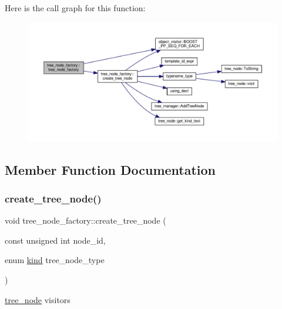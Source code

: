 Here is the call graph for this function\+:
\nopagebreak
\begin{figure}[H]
\begin{center}
\leavevmode
\includegraphics[width=350pt]{d8/da3/structtree__node__factory_ad35b91bf63870cd88d38af674a3d4c38_cgraph}
\end{center}
\end{figure}


\subsection{Member Function Documentation}
\mbox{\label{structtree__node__factory_a54487c2d0dfeeab04df6242dc59dd78f}} 
\subsubsection{\texorpdfstring{create\+\_\+tree\+\_\+node()}{create\_tree\_node()}}
{\footnotesize\ttfamily void tree\+\_\+node\+\_\+factory\+::create\+\_\+tree\+\_\+node (\begin{DoxyParamCaption}\item[{const unsigned int}]{node\+\_\+id,  }\item[{enum \hyperlink{tree__common_8hpp_a9efbd7c7191fb190b76c2fd05d6e7b45}{kind}}]{tree\+\_\+node\+\_\+type }\end{DoxyParamCaption})}



\hyperlink{classtree__node}{tree\+\_\+node} visitors 

